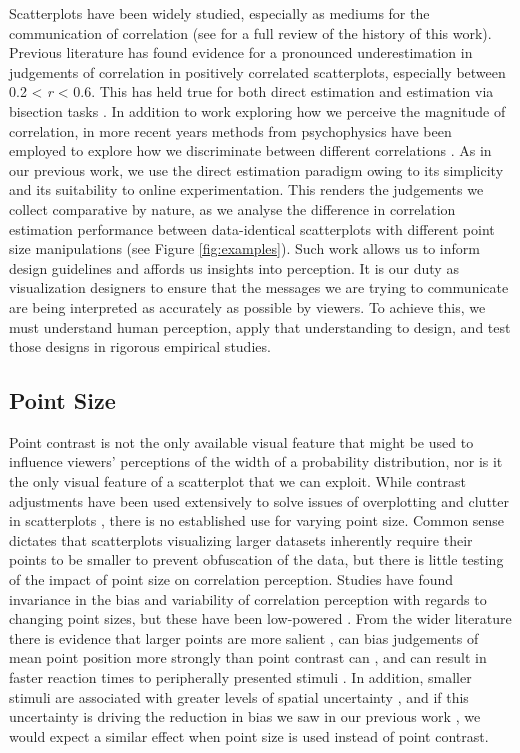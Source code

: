 \documentclass{vgtc}                          %
\begin{document}
Scatterplots have been widely studied, especially as mediums for the communication
of correlation (see \cite{strain_2023} for a full review of the history of this work).
Previous literature has found evidence for a pronounced underestimation in judgements
of correlation in positively correlated scatterplots, especially between 0.2 \textless{} \emph{r} \textless{} 0.6. This
has held true for both direct estimation \cite{meyer_1992, collyer_1990} and estimation
via bisection tasks \cite{rensink_2017}. In addition to work exploring how we
perceive the magnitude of correlation, in more recent years methods from psychophysics
have been employed to explore how we discriminate between different correlations
\cite{rensink_2014, rensink_2017}. As in our previous work,
we use the direct estimation paradigm owing to its simplicity and its suitability
to online experimentation. This renders the judgements we collect
comparative by nature, as we analyse the difference in correlation estimation performance
between data-identical scatterplots with different point size manipulations (see Figure \ref{fig:examples}).
Such work allows us to inform design guidelines and affords us insights into perception.
It is our duty as visualization designers to ensure that the
messages we are trying to communicate are being interpreted as accurately as possible
by viewers. To achieve this, we must understand human perception, apply that understanding
to design, and test those designs in rigorous empirical studies.

\hypertarget{point-size}{%
\subsection{Point Size}\label{point-size}}

Point contrast is not the only available visual feature that might be used
to influence viewers' perceptions of the width of a probability distribution, nor is
it the only visual feature of a scatterplot that we can exploit. While
contrast adjustments have been used extensively to solve issues of overplotting and clutter
in scatterplots \cite{matejka_2015, bertini_2004}, there is no established use for
varying point size. Common sense dictates that scatterplots visualizing larger
datasets inherently require their points to be smaller to prevent obfuscation of the data,
but there is little testing of the impact of point size on correlation perception.
Studies have found invariance in the bias and variability of correlation
perception with regards to changing point sizes, but these have been low-powered
\cite{rensink_2012, rensink_2014}. From the wider literature there is evidence
that larger points are more salient \cite{healey_2012}, can bias judgements of
mean point position more strongly than point contrast can \cite{hong_2021}, and can
result in faster reaction times to peripherally presented stimuli \cite{grice_1983}.
In addition, smaller stimuli are associated with greater levels of spatial uncertainty
\cite{alais_2004}, and if this uncertainty is driving the reduction in bias we saw in our previous work \cite{strain_2023},
we would expect a similar effect when point size is used instead of point contrast.
\end{document}
